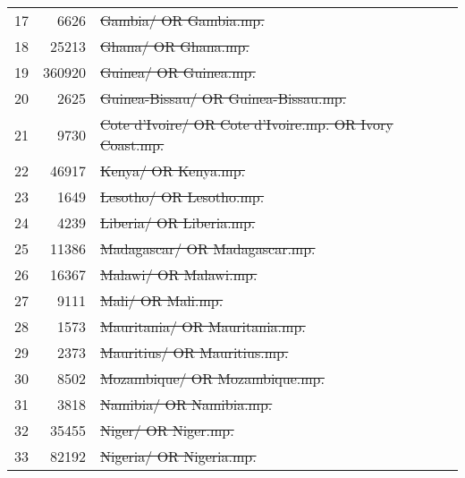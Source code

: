 \begin{tabular}{R{.02}R{.07}L{.82}}
	17 &   \num{6626} & \st{Gambia/ OR Gambia.mp.}                                                                \\
	18 &  \num{25213} & \st{Ghana/ OR Ghana.mp.}                                                                  \\
	19 & \num{360920} & \st{Guinea/ OR Guinea.mp.}                                                                \\
	20 &   \num{2625} & \st{Guinea-Bissau/ OR Guinea-Bissau.mp.}                                                  \\
	21 &   \num{9730} & \st{Cote d'Ivoire/ OR Cote d'Ivoire.mp. OR Ivory Coast.mp.}                               \\
	22 &  \num{46917} & \st{Kenya/ OR Kenya.mp.}                                                                  \\
	23 &   \num{1649} & \st{Lesotho/ OR Lesotho.mp.}                                                              \\
	24 &   \num{4239} & \st{Liberia/ OR Liberia.mp.}                                                              \\
	25 &  \num{11386} & \st{Madagascar/ OR Madagascar.mp.}                                                        \\
	26 &  \num{16367} & \st{Malawi/ OR Malawi.mp.}                                                                \\
	27 &   \num{9111} & \st{Mali/ OR Mali.mp.}                                                                    \\
	28 &   \num{1573} & \st{Mauritania/ OR Mauritania.mp.}                                                        \\
	29 &   \num{2373} & \st{Mauritius/ OR Mauritius.mp.}                                                          \\
	30 &   \num{8502} & \st{Mozambique/ OR Mozambique.mp.}                                                        \\
	31 &   \num{3818} & \st{Namibia/ OR Namibia.mp.}                                                              \\
	32 &  \num{35455} & \st{Niger/ OR Niger.mp.}                                                                  \\
	33 &  \num{82192} & \st{Nigeria/ OR Nigeria.mp.}                                                              \\

\end{tabular}
